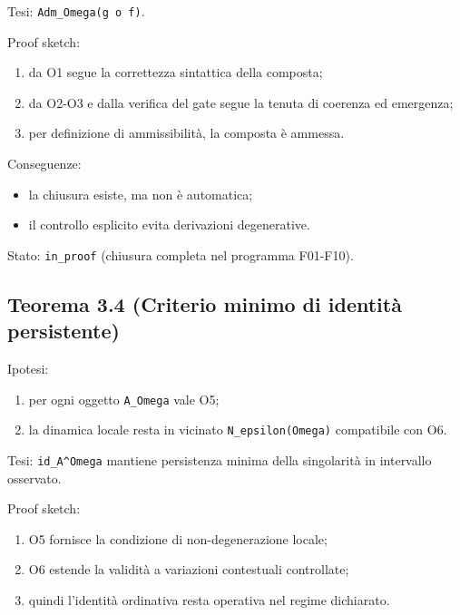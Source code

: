 Tesi:
\texttt{Adm\_Omega(g\ o\ f)}.

Proof sketch:

\begin{enumerate}
\def\labelenumi{\arabic{enumi}.}
\tightlist
\item
  da O1 segue la correttezza sintattica della composta;
\item
  da O2-O3 e dalla verifica del gate segue la tenuta di coerenza ed emergenza;
\item
  per definizione di ammissibilità, la composta è ammessa.
\end{enumerate}

Conseguenze:

\begin{itemize}
\tightlist
\item
  la chiusura esiste, ma non è automatica;
\item
  il controllo esplicito evita derivazioni degenerative.
\end{itemize}

Stato: \texttt{in\_proof} (chiusura completa nel programma F01-F10).

\subsection{Teorema 3.4 (Criterio minimo di identità persistente)}

Ipotesi:

\begin{enumerate}
\def\labelenumi{\arabic{enumi}.}
\tightlist
\item
  per ogni oggetto \texttt{A\_Omega} vale O5;
\item
  la dinamica locale resta in vicinato \texttt{N\_epsilon(Omega)} compatibile con O6.
\end{enumerate}

Tesi:
\texttt{id\_A\^{}Omega} mantiene persistenza minima della singolarità in intervallo osservato.

Proof sketch:

\begin{enumerate}
\def\labelenumi{\arabic{enumi}.}
\tightlist
\item
  O5 fornisce la condizione di non-degenerazione locale;
\item
  O6 estende la validità a variazioni contestuali controllate;
\item
  quindi l'identità ordinativa resta operativa nel regime dichiarato.
\end{enumerate}

